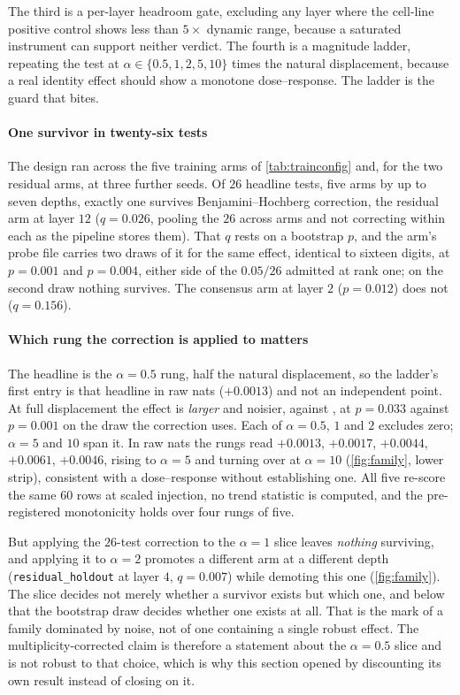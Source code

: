 The third is a per-layer headroom gate, excluding any layer where the cell-line
positive control shows less than $5\times$ dynamic range, because a saturated
instrument can support neither verdict. The fourth is a magnitude ladder,
repeating the test at $\alpha \in \{0.5, 1, 2, 5, 10\}$ times the natural
displacement, because a real identity effect should show a monotone
dose--response. The ladder is the guard that bites.

\paragraph{One survivor in twenty-six tests} The design ran across the five
training arms of \cref{tab:trainconfig} and, for the two residual arms, at three
further seeds. Of $26$ headline tests, five arms by up to seven depths, exactly
one survives Benjamini--Hochberg correction, the residual arm at layer $12$
($q = 0.026$, pooling the $26$ across arms and not correcting within each as the
pipeline stores them). That $q$ rests on a bootstrap $p$, and the arm's probe
file carries two draws of it for the same effect, identical to sixteen digits, at
$p = 0.001$ and $p = 0.004$, either side of the $0.05/26$ admitted at rank one;
on the second draw nothing survives. The consensus arm at layer $2$ ($p = 0.012$)
does not ($q = 0.156$).

\paragraph{Which rung the correction is applied to matters} The headline is the
$\alpha = 0.5$ rung, half the natural displacement, so the ladder's first entry
is that headline in raw nats ($+0.0013$) and not an independent point. At full
displacement the effect is \emph{larger} and noisier,
 against , at
$p = 0.033$ against $p = 0.001$ on the draw the correction uses. Each of
$\alpha = 0.5$, $1$ and $2$ excludes zero; $\alpha = 5$ and $10$ span it. In raw
nats the rungs read $+0.0013$, $+0.0017$, $+0.0044$, $+0.0061$, $+0.0046$, rising
to $\alpha = 5$ and turning over at $\alpha = 10$ (\cref{fig:family}, lower
strip), consistent with a dose--response without establishing one. All five
re-score the same $60$ rows at scaled injection, no trend statistic is computed,
and the pre-registered monotonicity holds over four rungs of five.

But applying the $26$-test correction to the $\alpha = 1$ slice leaves
\emph{nothing} surviving, and applying it to $\alpha = 2$ promotes a different
arm at a different depth (\texttt{residual\_holdout} at layer $4$, $q = 0.007$)
while demoting this one (\cref{fig:family}). The slice decides not merely
whether a survivor exists but which one, and below that the bootstrap draw
decides whether one exists at all. That is the mark of a family dominated by
noise, not of one containing a single robust effect. The multiplicity-corrected
claim is therefore a statement about the $\alpha = 0.5$ slice and is not robust
to that choice, which is why this section opened by discounting its own result
instead of closing on it.

